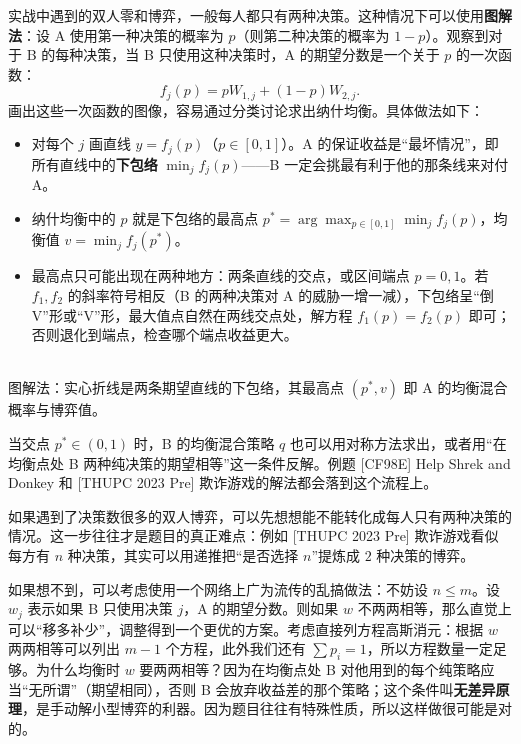 实战中遇到的双人零和博弈，一般每人都只有两种决策。这种情况下可以使用\textbf{图解法}：设 A 使用第一种决策的概率为 $p$（则第二种决策的概率为 $1-p$）。观察到对于 B 的每种决策，当 B 只使用这种决策时，A 的期望分数是一个关于 $p$ 的一次函数：
\[
 f_j(p)=pW_{1,j}+(1-p)W_{2,j}.
\]
画出这些一次函数的图像，容易通过分类讨论求出纳什均衡。具体做法如下：
\begin{itemize}
\item 对每个 $j$ 画直线 $y=f_j(p)$（$p\in[0,1]$）。A 的保证收益是“最坏情况”，即所有直线中的\textbf{下包络} $\min_j f_j(p)$——B 一定会挑最有利于他的那条线来对付 A。
\item 纳什均衡中的 $p$ 就是下包络的最高点 $p^*=\arg\max_{p\in[0,1]}\min_j f_j(p)$，均衡值 $v=\min_j f_j(p^*)$。
\item 最高点只可能出现在两种地方：两条直线的交点，或区间端点 $p=0,1$。若 $f_1,f_2$ 的斜率符号相反（B 的两种决策对 A 的威胁一增一减），下包络呈“倒 V”形或“V”形，最大值点自然在两线交点处，解方程 $f_1(p)=f_2(p)$ 即可；否则退化到端点，检查哪个端点收益更大。
\end{itemize}

\begin{center}
\\[2pt]
{\small 图解法：实心折线是两条期望直线的下包络，其最高点 $(p^*,v)$ 即 A 的均衡混合概率与博弈值。}
\end{center}

当交点 $p^*\in(0,1)$ 时，B 的均衡混合策略 $q$ 也可以用对称方法求出，或者用“在均衡点处 B 两种纯决策的期望相等”这一条件反解。例题 [CF98E] Help Shrek and Donkey 和 [THUPC 2023 Pre] 欺诈游戏的解法都会落到这个流程上。

如果遇到了决策数很多的双人博弈，可以先想想能不能转化成每人只有两种决策的情况。这一步往往才是题目的真正难点：例如 [THUPC 2023 Pre] 欺诈游戏看似每方有 $n$ 种决策，其实可以用递推把“是否选择 $n$”提炼成 $2$ 种决策的博弈。

如果想不到，可以考虑使用一个网络上广为流传的乱搞做法：不妨设 $n\le m$。设 $w_j$ 表示如果 B 只使用决策 $j$，A 的期望分数。则如果 $w$ 不两两相等，那么直觉上可以“移多补少”，调整得到一个更优的方案。考虑直接列方程高斯消元：根据 $w$ 两两相等可以列出 $m-1$ 个方程，此外我们还有 $\sum p_i=1$，所以方程数量一定足够。为什么均衡时 $w$ 要两两相等？因为在均衡点处 B 对他用到的每个纯策略应当“无所谓”（期望相同），否则 B 会放弃收益差的那个策略；这个条件叫\textbf{无差异原理}，是手动解小型博弈的利器。因为题目往往有特殊性质，所以这样做很可能是对的。

